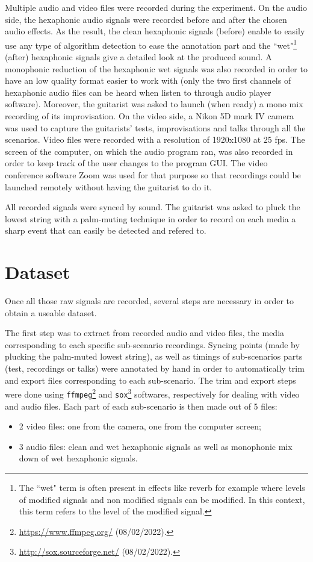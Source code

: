 \documentclass{article}
\begin{document}
Multiple audio and video files were recorded during the experiment. 
On the audio side, the hexaphonic audio signals were recorded before and after the chosen audio effects. As the result, the clean hexaphonic signals (before) enable to easily use any type of algorithm detection to ease the annotation part and the ``wet"\footnote{The ``wet" term is often present in effects like reverb for example where levels of modified signals and non modified signals can be modified. In this context, this term refers to the level of the modified signal.} (after) hexaphonic signals give a detailed look at the produced sound. A monophonic reduction of the hexaphonic wet signals was also recorded in order to have an low quality format easier to work with (only the two first channels of hexaphonic audio files can be heard when listen to through audio player software).
Moreover, the guitarist was asked to launch (when ready) a mono mix recording of its improvisation. On the video side, a Nikon 5D mark IV camera was used to capture the guitarists' tests, improvisations and talks through all the scenarios. Video files were recorded with a resolution of 1920x1080 at 25 fps. The screen of the computer, on which the audio program ran, was also recorded in order to keep track of the user changes to the program GUI. The video conference software Zoom was used for that purpose so that recordings could be launched remotely without having the guitarist to do it.

All recorded signals were synced by sound. The guitarist was asked to pluck the lowest string with a palm-muting technique in order to record on each media a sharp event that can easily be detected and refered to.

\section{Dataset}\label{sec:dataset}
Once all those raw signals are recorded, several steps are necessary in order to obtain a useable dataset. 

The first step was to extract from recorded audio and video files, the media corresponding to each specific sub-scenario recordings. Syncing points (made by plucking the palm-muted lowest string), as well as timings of sub-scenarios parts (test, recordings or talks) were annotated by hand in order to automatically trim and export files corresponding to each sub-scenario. The trim and export steps were done using \texttt{ffmpeg}\footnote{\url{https://www.ffmpeg.org/} (08/02/2022).} and \texttt{sox}\footnote{\url{http://sox.sourceforge.net/} (08/02/2022).} softwares, respectively for dealing with video and audio files. Each part of each sub-scenario is then made out of 5 files: 
\begin{itemize}
\item 2 video files: one from the camera, one from the computer screen;
\item 3 audio files: clean and wet hexaphonic signals as well as monophonic mix down of wet hexaphonic signals.
\end{itemize}  
\end{document}
